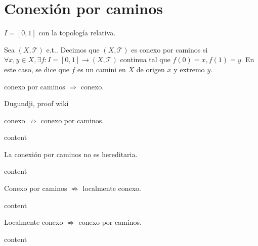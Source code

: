\section{Conexión por caminos}

\begin{obs}
  $I = [0, 1]$ con la topología relativa.
\end{obs}

\begin{defn}
  Sea $( X, \mathcal{T} )$ e.t.. Decimos que $( X, \mathcal{T} ) $ es conexo por caminos si $\forall x, y \in X, \exists f : I = [0, 1] \to ( X, \mathcal{T} )$ continua tal que $f(0) = x, f(1) = y$. En este caso, se dice que $ f $ es un camini en $X$ de origen $x$ y extremo $y$.
\end{defn}

\begin{obs}
  conexo por caminos $\Rightarrow$ conexo.
\end{obs}

\begin{dem}
  Dugundji, proof wiki
\end{dem}

\begin{obs}
  conexo $\not \Rightarrow $ conexo por caminos.
\end{obs}

\begin{ejm}
  content
\end{ejm}

\begin{obs}
  La conexión por caminos no es hereditaria.
\end{obs}

\begin{ejm}
  content
\end{ejm}

\begin{obs}
  Conexo por caminos $\not \Rightarrow $ localmente conexo.
\end{obs}

\begin{ejm}
  content
\end{ejm}

\begin{obs}
  Localmente conexo $\not \Rightarrow$ conexo por caminos.
\end{obs}

\begin{ejm}
  content
\end{ejm}

